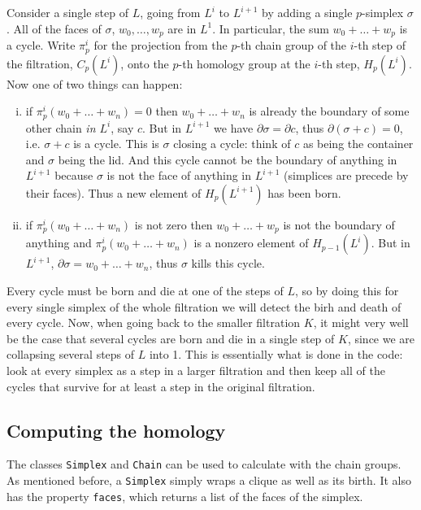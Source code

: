\documentclass[../main.tex]{subfiles}
\begin{document}
Consider a single step of \( L \), going from \( L^i \) to \( L^{i+1} \) by adding a
single \( p \)-simplex \( \sigma \). All of the faces of \( \sigma \), \( w_0, \dots, w_p
\) are in \( L^1 \). In particular, the sum \( w_0 + \dots + w_p \) is a cycle. Write \( \pi_p^i \) for the projection from the \( p \)-th chain
group of the \( i \)-th step of the filtration, \( C_p(L^i) \), onto the \( p \)-th
homology group at the \( i \)-th step, \( H_p(L^i) \). Now one of
two things can happen:
\begin{enumerate}[(i)]
	\item if \( \pi_p^i(w_0 + \dots + w_n) = 0 \) then \( w_0 + \dots + w_n \) is already
		the boundary of some other chain \emph{in \( L^i \)}, say \( c \). But in \( L^{i+1}
		\) we have \( \partial \sigma = \partial c \), thus \( \partial(\sigma + c) = 0 \),
		i.e. \( \sigma + c \) is a cycle. This is \( \sigma \) closing a cycle: think of \( c
		\) as being the container and \( \sigma \) being the lid. And this cycle cannot be the
		boundary of anything in \( L^{i+1} \) because \( \sigma \) is not the face of anything
		in \( L^{i+1} \) (simplices are precede by their faces). Thus a new element of \(
		H_p(L^{i+1}) \) has been born. 
	\item if \( \pi_p^i(w_0 + \dots + w_n) \) is not zero then \( w_0 + \dots + w_p \) is
		not the boundary of anything and \( \pi_p^i(w_0 + \dots + w_n) \) is a nonzero element
		of \( H_{p-1}(L^i) \). But in \( L^{i+1} \), \( \partial \sigma = w_0 + \dots + w_n
		\), thus \( \sigma \) kills this cycle. 
\end{enumerate}
Every cycle must be born and die at one of the steps of \( L \), so by doing this for
every single simplex of the whole filtration we will detect the birh and death of every
cycle. Now, when going back to the smaller filtration \( K \), it might very well be the
case that several cycles are born and die in a single step of \( K \), since we are
collapsing several steps of \( L \) into 1. This is essentially what is done in the code:
look at every simplex as a step in a larger filtration and then keep all of the cycles
that survive for at least a step in the original filtration. 


\subsection{Computing the homology}
The classes \texttt{Simplex} and \texttt{Chain} can be used to calculate with the chain
groups. As mentioned before, a \texttt{Simplex} simply wraps a clique as well as its
birth. It also has the property \texttt{faces}, which returns a list of the faces of the
simplex.
\end{document}
